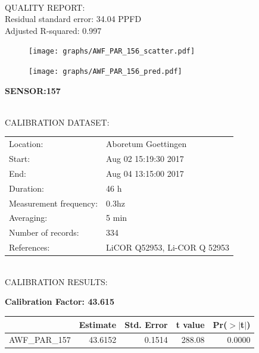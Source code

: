 \documentclass[oneside]{report}
\begin{document}
\hrulefill\\
QUALITY REPORT:\\
Residual standard error: 34.04 PPFD\\
Adjusted R-squared: 0.997



\begin{figure}[H]
  \centering
  \texttt{[image: graphs/AWF\_PAR\_156\_scatter.pdf]}
\end{figure}




\begin{figure}[H]
  \centering
  \texttt{[image: graphs/AWF\_PAR\_156\_pred.pdf]}
\end{figure}

\pagebreak


\begin{center}
\large{\textbf{SENSOR:157}}\\
\end{center}

\hrulefill\\
CALIBRATION DATASET:\\
\begin{table}[h!]
  \centering
  \label{tab:table1}
  \begin{tabular}{ll}
    Location: & Aboretum Goettingen\\ 
    
    
    Start:  & Aug 02 15:19:30 2017 \\
    End:   & Aug 04 13:15:00 2017\\ 
    Duration: & 46 h\\
    Measurement frequency: & 0.3hz\\
    Averaging:  &5 min\\
    Number of records: & 334 \\
    References: & LiCOR Q52953, Li-COR Q 52953 \\
  \end{tabular}
\end{table}

\hrulefill\\
CALIBRATION RESULTS:\\


\begin{center}
\textbf{\large{Calibration Factor: 43.615}}\\
\end{center}
\begin{table}[ht]
\centering
\begin{tabular}{rrrrr}
  \hline
 & Estimate & Std. Error & t value & Pr($>$$|$t$|$) \\ 
  \hline
AWF\_PAR\_157 & 43.6152 & 0.1514 & 288.08 & 0.0000 \\ 
   \hline
\end{tabular}
\end{table}
\end{document}
